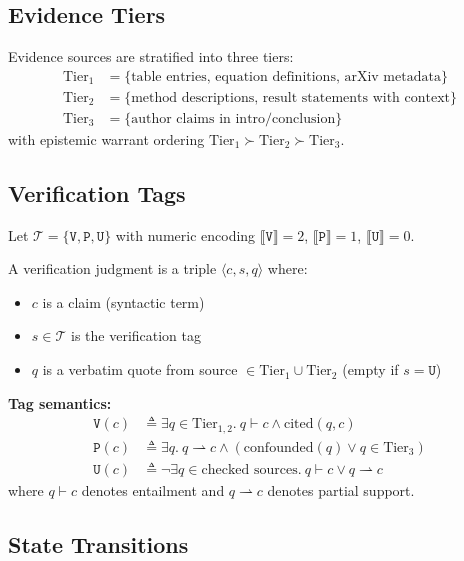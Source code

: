 \subsection{Evidence Tiers}

Evidence sources are stratified into three tiers:
\begin{align*}
\text{Tier}_1 &= \{\text{table entries, equation definitions, arXiv metadata}\} \\
\text{Tier}_2 &= \{\text{method descriptions, result statements with context}\} \\
\text{Tier}_3 &= \{\text{author claims in intro/conclusion}\}
\end{align*}
with epistemic warrant ordering $\text{Tier}_1 \succ \text{Tier}_2 \succ \text{Tier}_3$.

\subsection{Verification Tags}

Let $\mathcal{T} = \{\mathtt{V}, \mathtt{P}, \mathtt{U}\}$ with numeric encoding
$\llbracket \mathtt{V} \rrbracket = 2$, $\llbracket \mathtt{P} \rrbracket = 1$,
$\llbracket \mathtt{U} \rrbracket = 0$.

A verification judgment is a triple $\langle c, s, q \rangle$ where:
\begin{itemize}
\item $c$ is a claim (syntactic term)
\item $s \in \mathcal{T}$ is the verification tag
\item $q$ is a verbatim quote from source $\in \text{Tier}_1 \cup \text{Tier}_2$
      (empty if $s = \mathtt{U}$)
\end{itemize}

\textbf{Tag semantics:}
\begin{align*}
\mathtt{V}(c) &\triangleq \exists q \in \text{Tier}_{1,2}.\ q \vdash c
  \land \text{cited}(q, c) \\
\mathtt{P}(c) &\triangleq \exists q.\ q \rightharpoonup c
  \land (\text{confounded}(q) \lor q \in \text{Tier}_3) \\
\mathtt{U}(c) &\triangleq \neg \exists q \in \text{checked sources}.\
  q \vdash c \lor q \rightharpoonup c
\end{align*}
where $q \vdash c$ denotes entailment and $q \rightharpoonup c$ denotes partial support.

\subsection{State Transitions}

